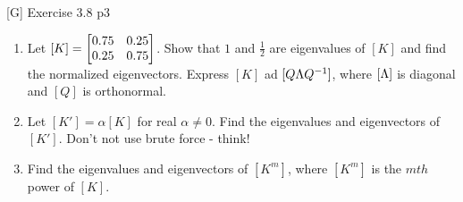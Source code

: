 \documentclass[a4paper, 11pt]{article}
\begin{document}
\begin{problem}{%
        [G] Exercise 3.8
    }{p3%
    }
    \begin{enumerate}[label=(\alph*)]
        \item Let $[K]=\left[\begin{matrix}0.75 & 0.25\\ 0.25 & 0.75\end{matrix}\right]$. Show that $1$ and $\frac12$ are eigenvalues of $[K]$ and find the normalized eigenvectors. Express $[K]$ ad $[Q\Lambda Q^{-1}]$, where $[\Lambda]$ is diagonal and $[Q]$ is orthonormal.
        \item Let $[K']=\alpha[K]$ for real $\alpha\neq 0$. Find the eigenvalues and eigenvectors of $[K']$. Don't not use brute force - think!
        \item Find the eigenvalues and eigenvectors of $[K^m]$, where $[K^m]$ is the $mth$ power of $[K]$.
    \end{enumerate}
\end{problem}
\end{document}
